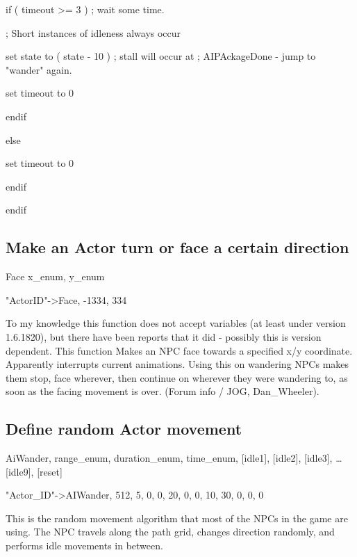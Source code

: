 \documentclass[
]{article}
\begin{document}
if ( timeout \textgreater= 3 ) ; wait some time.

; Short instances of idleness always occur

set state to ( state - 10 ) ; stall will occur at ; AIPAckageDone - jump
to "wander" again.

set timeout to 0

endif

else

set timeout to 0

endif

endif

\hypertarget{make-an-actor-turn-or-face-a-certain-direction}{%
\subsection{Make an Actor turn or face a certain
direction}\label{make-an-actor-turn-or-face-a-certain-direction}}

Face x\_enum, y\_enum

"ActorID"-\textgreater Face, -1334, 334

To my knowledge this function does not accept variables (at least under
version 1.6.1820), but there have been reports that it did - possibly
this is version dependent. This function Makes an NPC face towards a
specified x/y coordinate. Apparently interrupts current animations.
Using this on wandering NPCs makes them stop, face wherever, then
continue on wherever they were wandering to, as soon as the facing
movement is over. (Forum info / JOG, Dan\_Wheeler).

\hypertarget{define-random-actor-movement}{%
\subsection{Define random Actor
movement}\label{define-random-actor-movement}}

AiWander, range\_enum, duration\_enum, time\_enum, {[}idle1{]},
{[}idle2{]}, {[}idle3{]}, \ldots{[}idle9{]}, {[}reset{]}

"Actor\_ID"-\textgreater AIWander, 512, 5, 0, 0, 20, 0, 0, 10, 30, 0, 0,
0

This is the random movement algorithm that most of the NPCs in the game
are using. The NPC travels along the path grid, changes direction
randomly, and performs idle movements in between.
\end{document}
